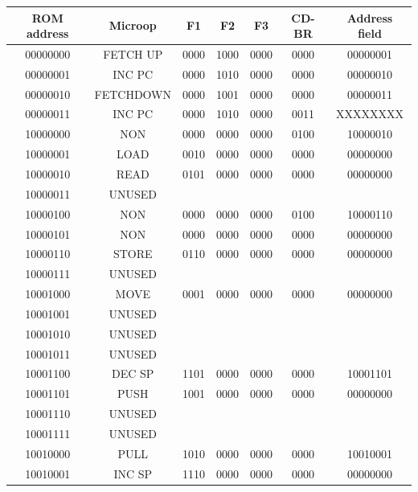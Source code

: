 \documentclass[pdftex,12pt,a4paper]{article}
\begin{document}
\begin{table}[h]
    \centering
    \begin{tabular}{|c|c|c|c|c|c|c|}
    \hline
    ROM address	&Microop&	F1&	F2&	F3&	CD-BR&		Address field \\\hline
00000000 &	FETCH UP&	0000 &	1000 &		0000    &	0000	 &		00000001 \\ \hline	
00000001 &	INC PC	&	0000 &	1010 &		0000	&   0000	 &		00000010 \\ \hline
00000010 &	FETCHDOWN&	0000 & 	1001 &		0000	&   0000	 &		00000011 \\ \hline
00000011 &	INC PC	&	0000 &	1010 &		0000	&   0011	 &		XXXXXXXX \\ \hline
10000000 &	NON	    & 0000 &	0000 &		0000	&   0100	 &		10000010 \\ \hline
10000001 &	LOAD	&	0010 &	0000 &		0000	&   0000	 &		00000000 \\ \hline
10000010 &	READ	&	0101 &	0000 &		0000	&   0000	 &		00000000 \\ \hline
10000011 &	UNUSED  &&&&& \\ \hline
10000100 &	NON	    &	0000&	0000    &	0000	&   0100	 &		10000110 \\ \hline
10000101 &	NON	    &	0000&	0000    &	0000	&   0000	 &		00000000\\ \hline
10000110 &	STORE	&	0110&	0000    &	0000	&   0000	 &		00000000\\ \hline
10000111 &	UNUSED  &&&&&                                   \\ \hline
10001000 &	MOVE	&	0001  &	0000    &	0000 &		0000	 &		00000000\\ \hline
10001001 &	UNUSED  &&&&&                                       \\ \hline
10001010 &	UNUSED  &&&&&                                        \\ \hline
10001011 &	UNUSED  &&&&&                                 			\\ \hline
10001100 &	DEC SP  &	1101    &	0000    &	0000 &		0000	 &		10001101\\ \hline
10001101 &	PUSH    &	1001    &	0000    &	0000 &		0000	 &		00000000\\ \hline
10001110 &	UNUSED&&&&&\\ \hline
10001111 &	UNUSED&&&&&\\ \hline
10010000 &	PULL    &	1010 &		0000 &		0000 &		0000	 &		10010001\\ \hline
10010001 &	INC  SP &	1110 &		0000 &		0000 &		0000	 &		00000000\\ \hline

\end{tabular}
\end{table}
\end{document}
